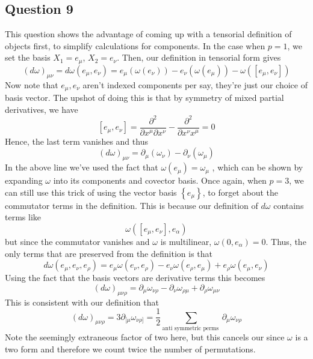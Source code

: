 \subsection{Question 9}
This question shows the advantage of coming up with a 
tensorial definition of objects first, to simplify calculations for
components. In the case when $ p = 1 $, we set the basis  $ X_1 = e_\mu$, $ X_2 = e_\nu$. 
Then, our definition in tensorial form gives 
\[
	( d\omega ) _{ \mu \nu } = d\omega( e_\mu, e_\nu ) =  e_\mu ( \omega ( e_\nu ) ) - e_\nu ( \omega ( e_\mu ) ) - \omega ( [ e_\mu, e_\nu ] ) 
\] Now note that $ e_\mu , e_\nu $ aren't indexed components per say, 
they're just our choice of basis vector. 
The upshot of doing this is that by symmetry of mixed partial derivatives, 
we have 
\[
 [ e_\mu , e_ \nu ] = \frac{\partial^ 2 }{\partial x^ \mu \partial x^ \nu } - \frac{\partial ^ 2 }{\partial  x^ \nu x ^ \mu }  = 0  
\] Hence, the last term vanishes and thus 
\[
	( d \omega)_{ \mu \nu } = \partial _ \mu ( \omega_ \nu ) - \partial  _ \nu ( \omega _ \mu ) 
\] In the above line we've used the fact that
$ \omega ( e _ \mu ) = \omega_ \mu $ , which can be shown by expanding $ \omega  $ into 
its components and covector basis. 
Once again, when $ p = 3 $, we can still use this trick of using
 the vector basis  $ \left\{  e_\mu  \right\}$, to forget about the 
 commutator terms in the definition. This is because our definition of $ d \omega $ contains terms like 
  \[
	  \omega ( [ e_\mu , e_ \nu ] , e _ \alpha ) 
  \] but since the commutator vanishes and $ \omega $ is multilinear, $ \omega ( 0 , e_ \alpha ) = 0 $. 
  Thus, the only terms that are preserved from 
  the definition is that 
   \[
   d\omega ( e_\mu , e_ \nu , e_ \rho ) = e _ \mu \omega ( e_ \nu , e _ \rho ) - e _ \nu \omega( e _ \rho , e_ \mu ) + e_ \rho \omega ( e_ \mu , e_ \nu ) 
  \] Using the fact that the basis vectors are derivative terms this becomes
  \[
   ( d \omega)_{ \mu \nu \rho } = \partial _ \mu \omega_{ \nu \rho } - \partial _ \nu \omega _{ \rho \mu } + \partial  _ \rho \omega_{ \mu \nu } 
  \] This is consistent with our definition that 
  \[
	  ( d\omega ) _{ \mu \nu \rho } = 3 \partial  _{ [ \mu } \omega_{ \nu \rho ] } = \frac{1}{2 } \sum_{ \text{anti symmetric perms }} \partial _ \mu \omega_{ \nu \rho }
  \] Note the seemingly extraneous factor of two here, but this cancels our since 
  $ \omega $ is a two form and therefore we count twice the number of permutations. 

